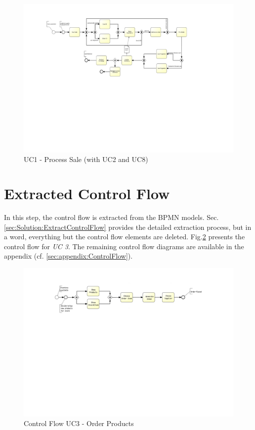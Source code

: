 \begin{figure}[h!]
	\centering
	\includegraphics[width=\textwidth, trim={4cm 10.9cm 8cm 2.3cm}]{img/UC1.pdf}
	\caption{UC1 - Process Sale (with UC2 and UC8)}
	\label{fig:UC1}
\end{figure}

\FloatBarrier


\section{Extracted Control Flow}
\label{sec:SolutionApplication:ExtractDataFlow}
In this step, the control flow is extracted from the BPMN models. Sec. \ref{sec:Solution:ExtractControlFlow} provides the detailed extraction process, but in a word, everything but the control flow elements are deleted. Fig.\ref{fig:UC3Control} presents the control flow for \textit{UC 3}. The remaining control flow diagrams are available in the appendix (cf. \ref{sec:appendix:ControlFlow}).  

\begin{figure}[h!]
	\centering
	\includegraphics[width=\textwidth, trim={5cm 14.5cm 6cm 2.5cm}]{img/UC3Control.pdf}
	\caption{Control Flow UC3 - Order Products}
	\label{fig:UC3Control}
\end{figure}

